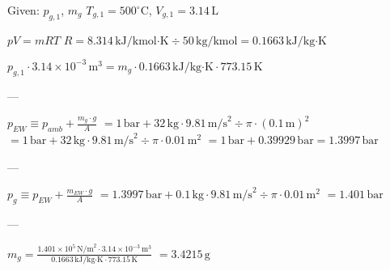 Given: \( p_{g,1} \), \( m_g \)  
\( T_{g,1} = 500^\circ \text{C} \), \( V_{g,1} = 3.14 \, \text{L} \)  

\( pV = mRT \)  
\( R = 8.314 \, \text{kJ/kmol·K} \div 50 \, \text{kg/kmol} = 0.1663 \, \text{kJ/kg·K} \)  

\( p_{g,1} \cdot 3.14 \times 10^{-3} \, \text{m}^3 = m_g \cdot 0.1663 \, \text{kJ/kg·K} \cdot 773.15 \, \text{K} \)  

---

\( p_{EW} \equiv p_{amb} + \frac{m_g \cdot g}{A} \)  
\( = 1 \, \text{bar} + 32 \, \text{kg} \cdot 9.81 \, \text{m/s}^2 \div \pi \cdot (0.1 \, \text{m})^2 \)  
\( = 1 \, \text{bar} + 32 \, \text{kg} \cdot 9.81 \, \text{m/s}^2 \div \pi \cdot 0.01 \, \text{m}^2 \)  
\( = 1 \, \text{bar} + 0.39929 \, \text{bar} = 1.3997 \, \text{bar} \)  

---

\( p_{g} \equiv p_{EW} + \frac{m_{EW} \cdot g}{A} \)  
\( = 1.3997 \, \text{bar} + 0.1 \, \text{kg} \cdot 9.81 \, \text{m/s}^2 \div \pi \cdot 0.01 \, \text{m}^2 \)  
\( = 1.401 \, \text{bar} \)  

---

\( m_g = \frac{1.401 \times 10^5 \, \text{N/m}^2 \cdot 3.14 \times 10^{-3} \, \text{m}^3}{0.1663 \, \text{kJ/kg·K} \cdot 773.15 \, \text{K}} \)  
\( = 3.4215 \, \text{g} \)